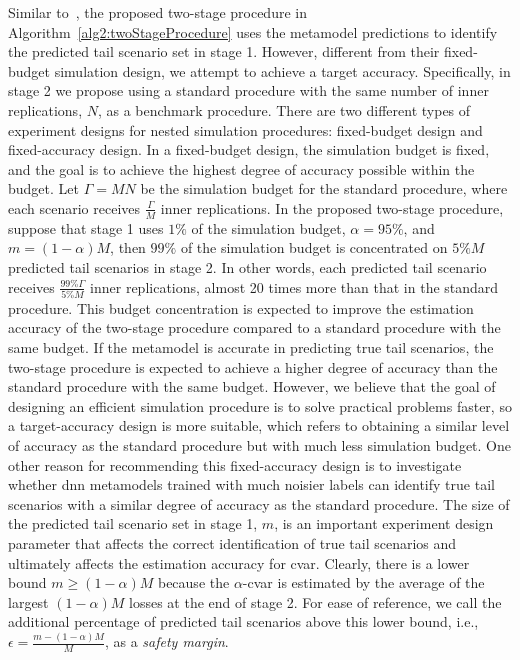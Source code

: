 Similar to~\cite{dang2020efficient}, the proposed two-stage procedure in Algorithm~\ref{alg2:twoStageProcedure} uses the metamodel predictions to identify the predicted tail scenario set in stage 1.
However, different from their fixed-budget simulation design, we attempt to achieve a target accuracy.
Specifically, in stage 2 we propose using a standard procedure with the same number of inner replications, $N$, as a benchmark procedure.
There are two different types of experiment designs for nested simulation procedures: fixed-budget design and fixed-accuracy design.
In a fixed-budget design, the simulation budget is fixed, and the goal is to achieve the highest degree of accuracy possible within the budget.
Let $\Gamma = MN$ be the simulation budget for the standard procedure, where each scenario receives $\frac{\Gamma}{M}$ inner replications.
In the proposed two-stage procedure, suppose that stage 1 uses $1\%$ of the simulation budget, $\alpha = 95\%$, and $m=(1-\alpha)M$, then $99\%$ of the simulation budget is concentrated on $5\% M$ predicted tail scenarios in stage 2.
In other words, each predicted tail scenario receives $\frac{99\% \Gamma}{5\% M}$ inner replications, almost 20 times more than that in the standard procedure.
This budget concentration is expected to improve the estimation accuracy of the two-stage procedure compared to a standard procedure with the same budget. 
If the metamodel is accurate in predicting true tail scenarios, the two-stage procedure is expected to achieve a higher degree of accuracy than the standard procedure with the same budget.
However, we believe that the goal of designing an efficient simulation procedure is to solve practical problems faster, so a target-accuracy design is more suitable, which refers to obtaining a similar level of accuracy as the standard procedure but with much less simulation budget.
One other reason for recommending this fixed-accuracy design is to investigate whether \gls{dnn} metamodels trained with much noisier labels can identify true tail scenarios with a similar degree of accuracy as the standard procedure.
The size of the predicted tail scenario set in stage 1, $m$, is an important experiment design parameter that affects the correct identification of true tail scenarios and ultimately affects the estimation accuracy for \gls{cvar}.
Clearly, there is a lower bound $m \geq (1-\alpha)M$ because the $\alpha$-\gls{cvar} is estimated by the average of the largest $(1-\alpha)M$ losses at the end of stage 2.
For ease of reference, we call the additional percentage of predicted tail scenarios above this lower bound, i.e., $\epsilon = \frac{m - (1-\alpha)M}{M}$, as a \textit{safety margin}.
